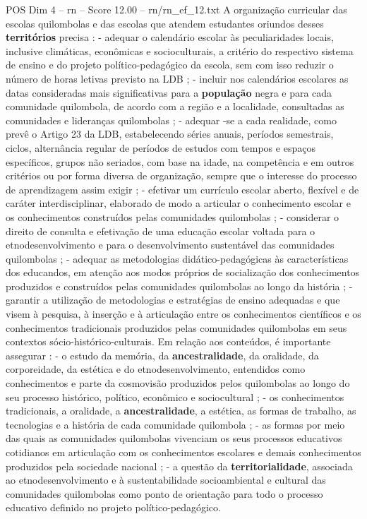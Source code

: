 \begin{textsample}{POS Dim 4 – rn – Score 12.00 – rn/rn\_ef\_12.txt}
A organização curricular das escolas quilombolas e das escolas que atendem estudantes oriundos desses \textbf{territórios} precisa : - adequar o calendário escolar às peculiaridades locais, inclusive climáticas, econômicas e socioculturais, a critério do respectivo sistema de ensino e do projeto político-pedagógico da escola, sem com isso reduzir o número de horas letivas previsto na LDB ; - incluir nos calendários escolares as datas consideradas mais significativas para a \textbf{população} negra e para cada comunidade quilombola, de acordo com a região e a localidade, consultadas as comunidades e lideranças quilombolas ; - adequar -se a cada realidade, como prevê o Artigo 23 da LDB, estabelecendo séries anuais, períodos semestrais, ciclos, alternância regular de períodos de estudos com tempos e espaços específicos, grupos não seriados, com base na idade, na competência e em outros critérios ou por forma diversa de organização, sempre que o interesse do processo de aprendizagem assim exigir ; - efetivar um currículo escolar aberto, flexível e de caráter interdisciplinar, elaborado de modo a articular o conhecimento escolar e os conhecimentos construídos pelas comunidades quilombolas ; - considerar o direito de consulta e efetivação de uma educação escolar voltada para o etnodesenvolvimento e para o desenvolvimento sustentável das comunidades quilombolas ; - adequar as metodologias didático-pedagógicas às características dos educandos, em atenção aos modos próprios de socialização dos conhecimentos produzidos e construídos pelas comunidades quilombolas ao longo da história ; - garantir a utilização de metodologias e estratégias de ensino adequadas e que visem à pesquisa, à inserção e à articulação entre os conhecimentos científicos e os conhecimentos tradicionais produzidos pelas comunidades quilombolas em seus contextos sócio-histórico-culturais.
Em relação aos conteúdos, é importante assegurar : - o estudo da memória, da \textbf{ancestralidade}, da oralidade, da corporeidade, da estética e do etnodesenvolvimento, entendidos como conhecimentos e parte da cosmovisão produzidos pelos quilombolas ao longo do seu processo histórico, político, econômico e sociocultural ; - os conhecimentos tradicionais, a oralidade, a \textbf{ancestralidade}, a estética, as formas de trabalho, as tecnologias e a história de cada comunidade quilombola ; - as formas por meio das quais as comunidades quilombolas vivenciam os seus processos educativos cotidianos em articulação com os conhecimentos escolares e demais conhecimentos produzidos pela sociedade nacional ; - a questão da \textbf{territorialidade}, associada ao etnodesenvolvimento e à sustentabilidade socioambiental e cultural das comunidades quilombolas como ponto de orientação para todo o processo educativo definido no projeto político-pedagógico.

\end{textsample}
